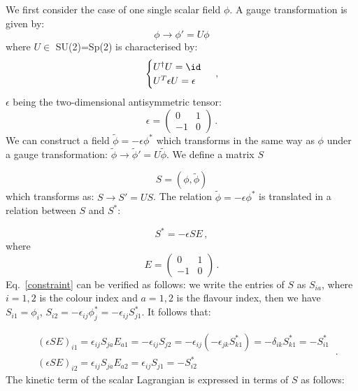 We first consider the case of one single scalar field $\phi$. A gauge transformation is given by:
%
\begin{equation}
\phi \to \phi' = U \phi
\end{equation}
%
where $U \in$ SU(2)=Sp(2) is characterised by: 
%
\begin{equation}
\begin{cases}
U^{\dagger}U = \id \\
U^{T}\epsilon U = \epsilon
\end{cases} \: ,
\end{equation}
%
$\epsilon$ being the two-dimensional antisymmetric tensor:
%
\begin{equation}
\epsilon =
\begin{pmatrix}
0 & 1 \\
-1 & 0
\end{pmatrix} \, .
\end{equation}
%
We can construct a field $\tilde{\phi}=-\epsilon \phi^*$ which transforms in the same way as $\phi$ under a gauge transformation:  $\tilde{\phi} \to \tilde{\phi}' = U \tilde{\phi}$.
%
We define a matrix $S$

\begin{equation}
S = (\phi, \tilde{\phi})
\label{S1}
\end{equation}
%
which transforms as: $S \to S'= US$.
The relation $\tilde{\phi}=-\epsilon \phi^*$ is translated in a relation between $S$ and $S^*$:

\begin{equation}
S^* = - \epsilon S E \, ,
\label{constraint}
\end{equation}
%
where
%
\begin{equation}
E =
\begin{pmatrix}
0 & 1 \\
-1 & 0
\end{pmatrix} \, .
\end{equation}
%
Eq.~\ref{constraint} can be verified as follows: we write the entries of $S$ as $S_{ia}$, where $i = 1,2$ is the colour index and $a = 1,2$ is the flavour index, then we have $S_{i1} = \phi_i$, $S_{i2} = - \epsilon_{ij} \phi^*_j = - \epsilon_{ij} S^*_{j1}$. It follows that:

\begin{equation}
\begin{split}
& (\epsilon S E)_{i1} = \epsilon_{ij} S_{ja} E_{a1} = - \epsilon_{ij} S_{j2} = -\epsilon_{ij} (- \epsilon_{jk} S_{k1}^*) = -\delta_{ik}S_{k1}^* = -S_{i1}^* \\
& (\epsilon S E)_{i2} = \epsilon_{ij} S_{ja} E_{a2} = \epsilon_{ij} S_{j1} = - S_{i2}^*
\end{split} \: .
\end{equation}
%
The kinetic term of the scalar Lagrangian is expressed in terms of $S$ as follows:

